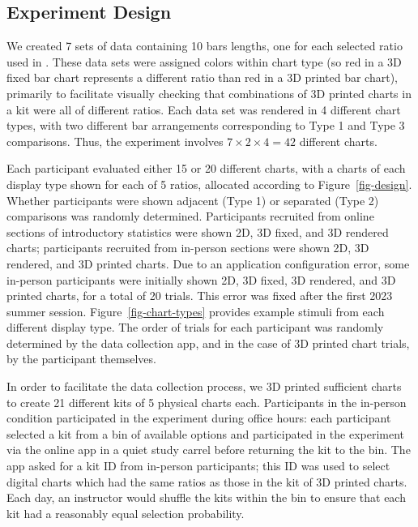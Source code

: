 \documentclass[runningheads
]{llncs}
\begin{document}
\hypertarget{experiment-design}{%
\subsection{Experiment Design}\label{experiment-design}}

We created 7 sets of data containing 10 bars lengths, one for each
selected ratio used in
\textcite{clevelandGraphicalPerceptionTheory1984}. These data sets were
assigned colors within chart type (so red in a 3D fixed bar chart
represents a different ratio than red in a 3D printed bar chart),
primarily to facilitate visually checking that combinations of 3D
printed charts in a kit were all of different ratios. Each data set was
rendered in 4 different chart types, with two different bar arrangements
corresponding to Type 1 and Type 3 comparisons. Thus, the experiment
involves \(7 \times 2 \times 4 = 42\) different charts.

Each participant evaluated either 15 or 20 different charts, with a
charts of each display type shown for each of 5 ratios, allocated
according to Figure~\ref{fig-design}. Whether participants were shown
adjacent (Type 1) or separated (Type 2) comparisons was randomly
determined. Participants recruited from online sections of introductory
statistics were shown 2D, 3D fixed, and 3D rendered charts; participants
recruited from in-person sections were shown 2D, 3D rendered, and 3D
printed charts. Due to an application configuration error, some
in-person participants were initially shown 2D, 3D fixed, 3D rendered,
and 3D printed charts, for a total of 20 trials. This error was fixed
after the first 2023 summer session. Figure~\ref{fig-chart-types}
provides example stimuli from each different display type. The order of
trials for each participant was randomly determined by the data
collection app, and in the case of 3D printed chart trials, by the
participant themselves.

In order to facilitate the data collection process, we 3D printed
sufficient charts to create 21 different kits of 5 physical charts each.
Participants in the in-person condition participated in the experiment
during office hours: each participant selected a kit from a bin of
available options and participated in the experiment via the online app
in a quiet study carrel before returning the kit to the bin. The app
asked for a kit ID from in-person participants; this ID was used to
select digital charts which had the same ratios as those in the kit of
3D printed charts. Each day, an instructor would shuffle the kits within
the bin to ensure that each kit had a reasonably equal selection
probability.
\end{document}
